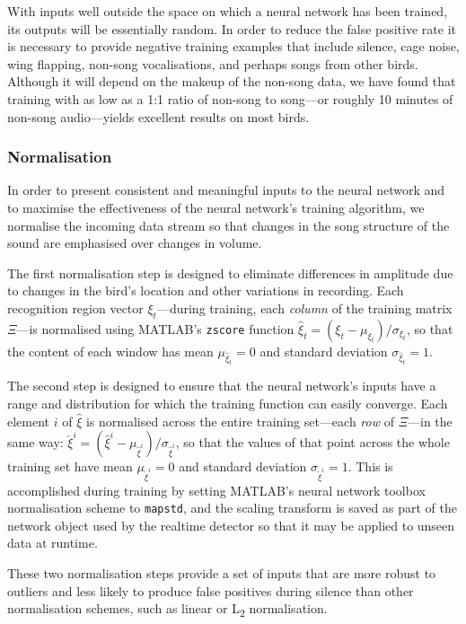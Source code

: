 \documentclass[10pt,letterpaper]{article}
\begin{document}
With inputs well outside the space on which a neural network has been
trained, its outputs will be essentially random. In order to reduce
the false positive rate it is necessary to provide negative training
examples that include silence, cage noise, wing flapping, non-song
vocalisations, and perhaps songs from other birds.  Although it will
depend on the makeup of the non-song data, we have found that training
with as low as a 1:1 ratio of non-song to song---or roughly 10
minutes of non-song audio---yields excellent results on most birds.


\subsubsection{Normalisation}

In order to present consistent and meaningful inputs to the neural
network and to maximise the effectiveness of the neural network's training
algorithm, we normalise the incoming data stream so that changes in the
song structure of the sound are emphasised over changes in volume.

The first normalisation step is designed to eliminate differences in
amplitude due to changes in the bird's location and other variations
in recording.  Each recognition region vector $\xi_t$---during
training, each {\em column} of the training matrix $\Xi$---is
normalised using MATLAB's {\tt zscore} function $\hat{\xi}_t = (\xi_t
- \mu_{\xi_t}) / \sigma_{\xi_t}$, so that the content of each window
has mean $\mu_{\hat{\xi}_t}=0$ and standard deviation
$\sigma_{\hat{\xi}_t}=1$.

The second step is designed to ensure that the neural network's inputs
have a range and distribution for which the training function can
easily converge.  Each element $i$ of $\hat{\xi}$ is normalised across
the entire training set---each {\em row} of $\Xi$---in the same way:
$\check{\xi}^i = (\hat{\xi}^i -
\mu_{\hat{\xi}^i})/\sigma_{\hat{\xi}^i}$, so that the values of that
point across the whole training set have mean $\mu_{\check{\xi}^i}=0$
and standard deviation $\sigma_{\check{\xi}^i}=1$.  This is
accomplished during training by setting MATLAB's neural network
toolbox normalisation scheme to {\tt mapstd}, and the scaling
transform is saved as part of the network object used by the realtime
detector so that it may be applied to unseen data at runtime.

These two normalisation steps provide a set of inputs that are more
robust to outliers and less likely to produce false positives during
silence than other normalisation schemes, such as linear or
L\textsubscript{2} normalisation.
\end{document}
